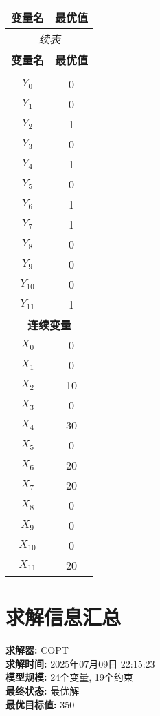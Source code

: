 \documentclass[a4paper,10pt]{article}
\begin{document}
\begin{center}
\begin{longtable}{cc}
\toprule
\textbf{变量名} & \textbf{最优值} \\
\midrule
\endfirsthead
\multicolumn{2}{c}{\textit{续表}} \\
\toprule
\textbf{变量名} & \textbf{最优值} \\
\midrule
\endhead
\bottomrule
\endfoot
\bottomrule
\endlastfoot
\multicolumn{2}{c}{\textbf{二元变量}} \\
\midrule
$Y_{0}$ & 0 \\
$Y_{1}$ & 0 \\
$Y_{2}$ & 1 \\
$Y_{3}$ & 0 \\
$Y_{4}$ & 1 \\
$Y_{5}$ & 0 \\
$Y_{6}$ & 1 \\
$Y_{7}$ & 1 \\
$Y_{8}$ & 0 \\
$Y_{9}$ & 0 \\
$Y_{10}$ & 0 \\
$Y_{11}$ & 1 \\
\midrule
\multicolumn{2}{c}{\textbf{连续变量}} \\
\midrule
$X_{0}$ & 0 \\
$X_{1}$ & 0 \\
$X_{2}$ & 10 \\
$X_{3}$ & 0 \\
$X_{4}$ & 30 \\
$X_{5}$ & 0 \\
$X_{6}$ & 20 \\
$X_{7}$ & 20 \\
$X_{8}$ & 0 \\
$X_{9}$ & 0 \\
$X_{10}$ & 0 \\
$X_{11}$ & 20 \\
\end{longtable}
\end{center}

\section{求解信息汇总}

\textbf{求解器:} COPT \\
\textbf{求解时间:} 2025年07月09日 22:15:23 \\
\textbf{模型规模:} 24个变量, 19个约束 \\
\textbf{最终状态:} 最优解 \\
\textbf{最优目标值:} 350
\end{document}
